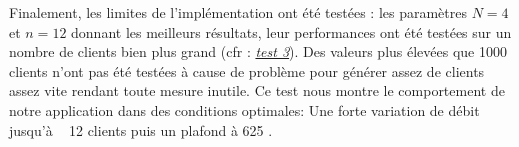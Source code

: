 \documentclass[../main.tex]{subfiles}
\begin{document}
Finalement, les limites de l'implémentation ont été testées : les paramètres $N = 4$ et $n = 12$ donnant les meilleurs résultats, leur performances ont été 
testées sur un nombre de clients bien plus grand (cfr : \hyperref[sec:plot_max]{\textit{test 3}}). Des valeurs plus élevées que 1000 clients n'ont pas été 
testées à cause de problème pour générer assez de clients assez vite rendant toute mesure inutile.
Ce test nous montre le comportement de notre application dans des conditions optimales: Une forte variation de débit jusqu'à ~ 12 clients puis un plafond à 625 .
\end{document}
